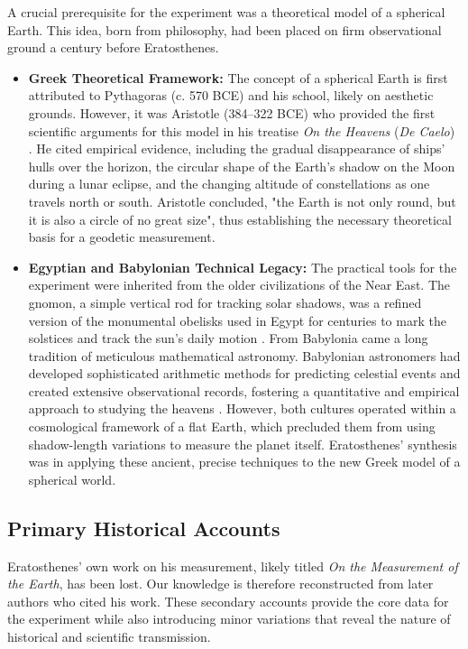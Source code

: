 \documentclass[11pt]{article}
\begin{document}
A crucial prerequisite for the experiment was a theoretical model of a spherical Earth. This idea, born from philosophy, had been placed on firm observational ground a century before Eratosthenes.

\begin{itemize}
    \item \textbf{Greek Theoretical Framework:} The concept of a spherical Earth is first attributed to Pythagoras (c. 570 BCE) and his school, likely on aesthetic grounds. However, it was Aristotle (384–322 BCE) who provided the first scientific arguments for this model in his treatise \textit{On the Heavens} (\textit{De Caelo}) \cite{Aristotle350BCE}. He cited empirical evidence, including the gradual disappearance of ships' hulls over the horizon, the circular shape of the Earth's shadow on the Moon during a lunar eclipse, and the changing altitude of constellations as one travels north or south. Aristotle concluded, "the Earth is not only round, but it is also a circle of no great size", thus establishing the necessary theoretical basis for a geodetic measurement.

    \item \textbf{Egyptian and Babylonian Technical Legacy:} The practical tools for the experiment were inherited from the older civilizations of the Near East. The gnomon, a simple vertical rod for tracking solar shadows, was a refined version of the monumental obelisks used in Egypt for centuries to mark the solstices and track the sun's daily motion \cite{Pannekoek1961}. From Babylonia came a long tradition of meticulous mathematical astronomy. Babylonian astronomers had developed sophisticated arithmetic methods for predicting celestial events and created extensive observational records, fostering a quantitative and empirical approach to studying the heavens \cite{Neugebauer1957}. However, both cultures operated within a cosmological framework of a flat Earth, which precluded them from using shadow-length variations to measure the planet itself. Eratosthenes' synthesis was in applying these ancient, precise techniques to the new Greek model of a spherical world.
\end{itemize}

\subsection{Primary Historical Accounts}

Eratosthenes' own work on his measurement, likely titled \textit{On the Measurement of the Earth}, has been lost. Our knowledge is therefore reconstructed from later authors who cited his work. These secondary accounts provide the core data for the experiment while also introducing minor variations that reveal the nature of historical and scientific transmission.
\end{document}
